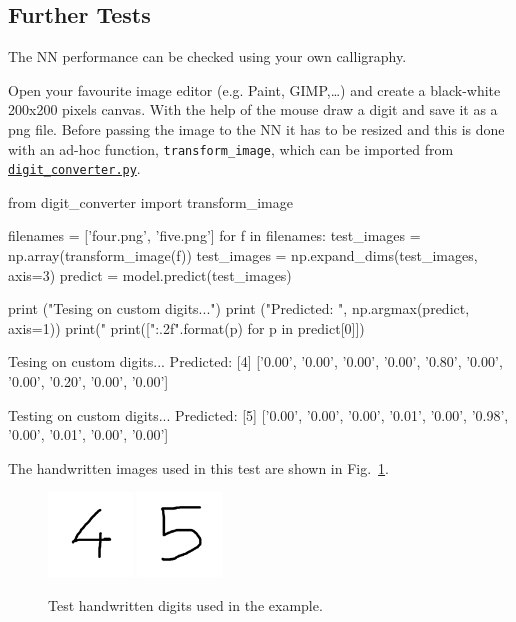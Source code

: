 
\subsection{Further Tests}
The NN performance can be checked using your own calligraphy. 

Open your favourite image editor (e.g. Paint, GIMP,\ldots) and create a black-white 200x200 pixels canvas. With the help of the mouse draw a digit and save it as a png file.
Before passing the image to the NN it has to be resized and this is done with an ad-hoc function, \texttt{transform\_image}, which can be imported from \href{https://raw.githubusercontent.com/matteosan1/finance_course/develop/libro/input_files/digit_converter.py}{\texttt{digit\_converter.py}}.

\begin{ipython}
from digit_converter import transform_image

filenames = ['four.png', 'five.png']
for f in filenames:
    test_images = np.array(transform_image(f))
test_images = np.expand_dims(test_images, axis=3)
predict = model.predict(test_images)

print ("Tesing on custom digits...")
print ("Predicted: ", np.argmax(predict, axis=1))
print("%
print(["{:.2f}".format(p) for p in predict[0]])
\end{ipython}
\begin{ioutput}
Tesing on custom digits...
Predicted:  [4]
['0.00', '0.00', '0.00', '0.00', '0.80', '0.00', '0.00', '0.20', '0.00', 
'0.00']

Testing on custom digits...
Predicted:  [5]
['0.00', '0.00', '0.00', '0.01', '0.00', '0.98', '0.00', '0.01', '0.00', 
'0.00']
\end{ioutput}
The handwritten images used in this test are shown in Fig.~\ref{fig:test_images}.

\begin{figure}[htb]
\centering
\includegraphics[width=0.2\textwidth]{figures/four.png}
\includegraphics[width=0.2\textwidth]{figures/five.png}
\caption{Test handwritten digits used in the example.}
\label{fig:test_images}
\end{figure}

